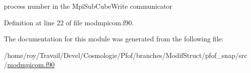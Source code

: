 process number in the Mpi\-Sub\-Cube\-Write communicator 



Definition at line 22 of file modmpicom.\-f90.



The documentation for this module was generated from the following file\-:\begin{DoxyCompactItemize}
\item 
/home/roy/\-Travail/\-Devel/\-Cosmologie/\-Pfof/branches/\-Modif\-Struct/pfof\-\_\-snap/src/\hyperlink{pfof__snap_2src_2modmpicom_8f90}{modmpicom.\-f90}\end{DoxyCompactItemize}
